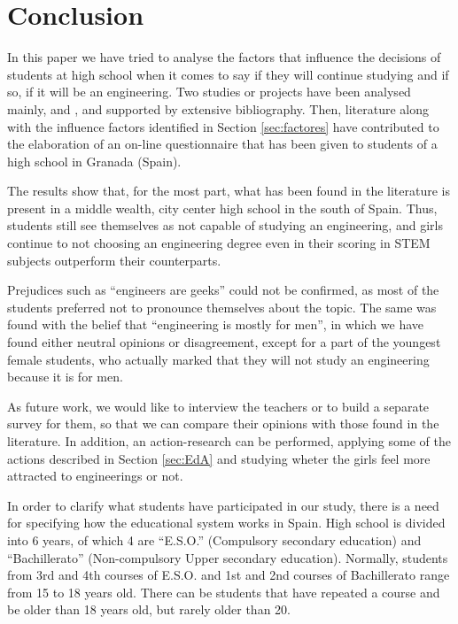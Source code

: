 \documentclass[journal,transmag]{IEEEtran}
\begin{document}
\section{Conclusion}
\label{sec:conclusions}

In this paper we have tried to analyse the factors that influence the decisions of students at high school when it comes to say if they will continue studying and if so, if it will be an engineering. Two studies or projects have been analysed mainly, \cite{everis2012} and \cite{mtg2015}, and supported by extensive bibliography. Then, literature along with the influence factors identified in Section \ref{sec:factores} have contributed to the elaboration of an on-line questionnaire that has been given to students of a high school in Granada (Spain).

The results show that, for the most part, what has been found in the literature is present in a middle wealth, city center high school in the south of Spain. Thus, students still see themselves as not capable of studying an engineering, and girls continue to not choosing an engineering degree even in their scoring in STEM subjects outperform their counterparts.

Prejudices such as ``engineers are geeks'' could not be confirmed, as most of the students preferred not to pronounce themselves about the topic. The same was found with the belief that ``engineering is mostly for men'', in which we have found either neutral opinions or disagreement, except for a part of the youngest female students, who actually marked that they will not study an engineering because it is for men.

As future work, we would like to interview the teachers or to build a separate survey for them, so that we can compare their opinions with those found in the literature. In addition, an action-research can be performed, applying some of the actions described in Section \ref{sec:EdA} and studying wheter the girls feel more attracted to engineerings or not.

\label{ap:courses}

In order to clarify what students have participated in our study, there is a need for specifying how the educational system works in Spain. High school is divided into 6 years, of which 4 are ``E.S.O.'' (Compulsory secondary education) and ``Bachillerato'' (Non-compulsory Upper secondary education). Normally, students from 3rd and 4th courses of E.S.O. and 1st and 2nd courses of Bachillerato range from 15 to 18 years old. There can be students that have repeated a course and be older than 18 years old, but rarely older than 20.
\end{document}
